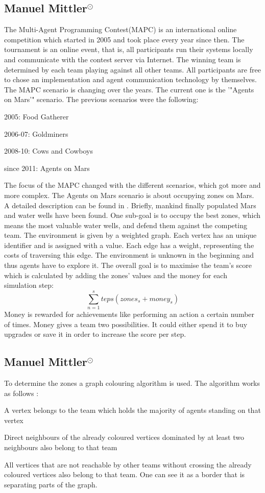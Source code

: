 \subsection[Multi Agent Programming Contest]{Manuel Mittler$^{\odot}$}
The Multi-Agent Programming Contest(MAPC) is an international online competition which started in 2005 and took place every year since then. The tournament is an online event, that is, all participants run their systems locally and communicate with the contest server via Internet. The winning team is determined by each team playing against all other teams. All participants are free to chose an implementation and agent communication technology by themselves. The MAPC scenario is changing over the years. The current one is the ’"Agents on Mars’" scenario. The previous scenarios were the following:
\begin{description}
	\item 2005: Food Gatherer
	\item 2006-07: Goldminers
	\item 2008-10: Cows and Cowboys
	\item since 2011: Agents on Mars
\end{description}
The focus of the MAPC changed with the different scenarios, which got more and more complex. The Agents on Mars scenario is about occupying zones on Mars. A detailed description can be found in \cite{MAPC}. Briefly, mankind finally populated Mars and water wells have been found. One sub-goal is to occupy the best zones, which means the most valuable water wells, and defend them against the competing team. The environment is given by a weighted graph. Each vertex has an unique identiﬁer and is assigned with a value. Each edge has a weight, representing the costs of traversing this edge. The environment is unknown in the beginning and thus agents have to explore it. The overall goal is to maximise the team's score which is calculated by adding the zones' values and the money for each simulation step:
\begin{equation}
	\sum_{n=1}^steps (zones_s + money_s)
\end{equation}
Money is rewarded for achievements like performing an action a certain number of times. Money gives a team two possibilities. It could either spend it to buy upgrades or save it in order to increase the score per step.
\subsection[Zones]{Manuel Mittler$^{\odot}$}
To determine the zones a graph colouring algorithm is used. The algorithm works as follows \cite{MAPC}:
\begin{description}
	\item A vertex belongs to the team which holds the majority of agents standing on that vertex
	\item Direct neighbours of the already coloured vertices dominated by at least two neighbours also belong to that team
	\item All vertices that are not reachable by other teams without crossing the already coloured vertices also belong to that team. One can see it as a border that	is separating parts of the graph.
\end{description}